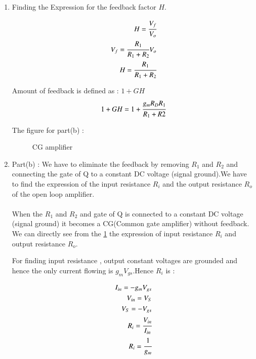 \begin{enumerate}[label=\thesubsection.\arabic*.,ref=\thesubsection.\theenumi]
\item Finding the Expression for the feedback factor $H$.\\
\solution

\begin{align}
H = \cfrac{V_{f}}{V_{o}}\\
V_{f} = \cfrac{R_{1}}{R_{1}+R_{2}}V_{o}\\
H = \cfrac{R_{1}}{R_{1}+R_{2}}
\end{align}


Amount of feedback is defined as : $1+GH$
\begin{align}
1+GH = 1 + \cfrac{g_{m}R_{D}R_{1}}{R_{1}+R{2}} 
\end{align}




The figure for part(b) :

\begin{figure}[h!]
	\begin{center}
		\resizebox{\columnwidth/1}{!}{}
	\end{center}
	\caption{CG amplifier}
	\label{fig:CG amplifier}
\end{figure}

\item Part(b) : We have to eliminate the feedback by removing $R_{1}$ and $R_{2}$ and connecting the gate of Q to a constant DC voltage (signal ground).We have to find the expression of the input resistance  $R_{i}$ and the output resistance $R_{o}$ of the open loop amplifier.\\
\solution\\
When the $R_{1}$ and $R_{2}$ and gate of Q is connected to a constant DC voltage (signal ground) it becomes a CG(Common gate amplifier) without feedback.
We can directly see from the \ref{fig:CG amplifier} the expression of input resistance $R_{i}$ and output resistance $R_{o}$.


For finding input resistance , output constant voltages are grounded and hence the only current flowing is $g_{m}V_{gs}$.Hence $R_{i}$ is :



\begin{align}
I_{in} = -g_{m}V_{gs}\\
V_{in} = V_{S}\\
V_{S} = -V_{gs}\\
R_{i} = \cfrac{V_{in}}{I_{in}}\\
R_{i} = \cfrac{1}{g_{m}}
\end{align}


\end{enumerate}
